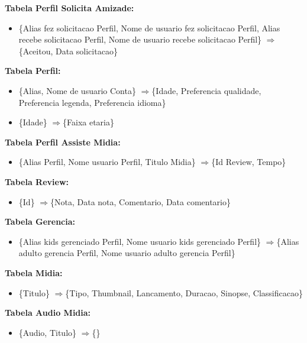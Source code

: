 \documentclass[12pt,a4paper]{article}
\newcommand{\rarrow}{$\Longrightarrow$}
\begin{document}
    {\bf Tabela Perfil Solicita Amizade: }
    \begin{itemize}
        \item \{Alias fez solicitacao Perfil, Nome de usuario fez solicitacao Perfil, Alias recebe solicitacao Perfil, Nome de usuario recebe solicitacao Perfil\} \rarrow \{Aceitou, Data solicitacao\} \\
    \end{itemize}
    
    {\bf Tabela Perfil: }
    \begin{itemize}
        \item \{Alias, Nome de usuario Conta\} \rarrow \{Idade, Preferencia qualidade, Preferencia legenda, Preferencia idioma\}
        \item \{Idade\} \rarrow \{Faixa etaria\} \\
    \end{itemize}
    
    {\bf Tabela Perfil Assiste Midia: }
    \begin{itemize}
        \item \{Alias Perfil, Nome usuario Perfil, Titulo Midia\} \rarrow \{Id Review, Tempo\} \\
    \end{itemize}
    
    {\bf Tabela Review:}
    \begin{itemize}
        \item \{Id\} \rarrow \{Nota, Data nota, Comentario, Data comentario\} \\
    \end{itemize}
    
    {\bf Tabela Gerencia: }
    \begin{itemize}
        \item \{Alias kids gerenciado Perfil, Nome usuario kids gerenciado Perfil\} \rarrow \{Alias adulto gerencia Perfil, Nome usuario adulto gerencia Perfil\} \\
    \end{itemize}
    
    {\bf Tabela Midia: }
    \begin{itemize}
        \item \{Titulo\} \rarrow \{Tipo, Thumbnail, Lancamento, Duracao, Sinopse, Classificacao\} \\
    \end{itemize}
    
    {\bf Tabela Audio Midia: }
    \begin{itemize}
        \item \{Audio, Titulo\} \rarrow \{\} \\
    \end{itemize}
    
\end{document}
